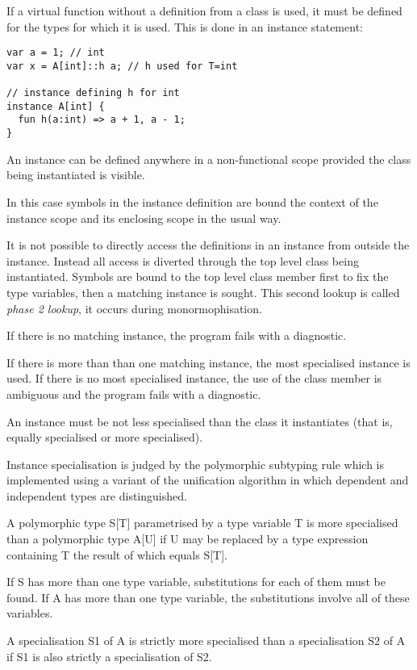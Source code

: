\documentclass[oneside]{book}
\begin{document}
If a virtual function without a definition from a class is used, it must be
defined for the types for which it is used. This is done in an
instance statement:

\begin{verbatim}
var a = 1; // int
var x = A[int]::h a; // h used for T=int

// instance defining h for int
instance A[int] {
  fun h(a:int) => a + 1, a - 1;
}
\end{verbatim}

An instance can be defined anywhere in a non-functional scope
provided the class being instantiated is visible.

In this case symbols in the instance definition are bound
the context of the instance scope and its enclosing scope
in the usual way.

It is not possible to directly access the definitions
in an instance from outside the instance. Instead all
access is diverted through the top level class being
instantiated. Symbols are bound to the top level class
member first to fix the type variables, then a matching
instance is sought. This second lookup is called {\em phase 2 lookup},
it occurs during monormophisation.

If there is no matching instance, the program
fails with a diagnostic.

If there is more than than one matching instance,
the most specialised instance is used. If there
is no most specialised instance, the use of the class
member is ambiguous and the program fails with
a diagnostic.

An instance must be not less specialised than the class
it instantiates (that is, equally specialised or more specialised).

Instance specialisation is judged by the polymorphic subtyping
rule which is implemented using a variant of the
unification algorithm in which dependent and independent types
are distinguished.

A polymorphic type S[T] parametrised by a type variable T is more
specialised than a polymorphic type A[U] if U may be
replaced by a type expression containing T the result of which
equals S[T].

If S has more than one type variable, substitutions for each
of them must be found. If A has more than one type variable,
the substitutions involve all of these variables.

A specialisation S1 of A is strictly more specialised than a specialisation
S2 of A if S1 is also strictly a specialisation of S2.
\end{document}
